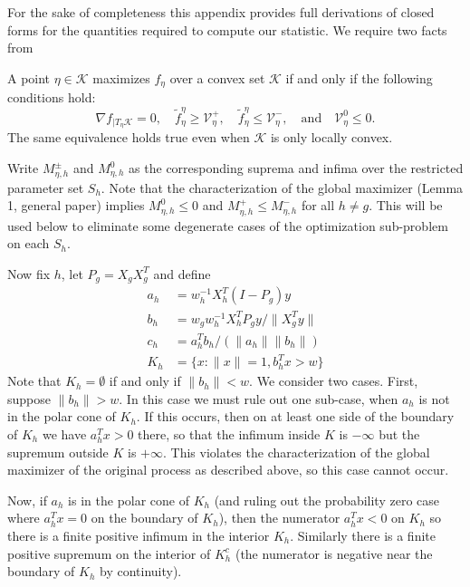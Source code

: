 \documentclass{imsart}
\newcommand{\todo}{\textcolor{red}{\textbf{To do: }}}
\newcommand{\norm}[1]{\lVert #1 \rVert}
\newcommand{\grad}{\nabla}
\newcommand{\V}{\mathcal{V}}\endlocaldefs
\newcommand{\K}{\mathcal{K}}
\newcommand\tf{\widetilde{f}}
\begin{document}

For the sake of completeness this appendix provides full derivations
of closed forms for the quantities required to compute our
statistic. We require two facts from \cite{tests:adaptive}

A point $\eta \in \K$ maximizes $f_\eta$ over a convex
set $\K$ if and only if the following conditions hold: 
\begin{equation}
\label{eq:maxcond}
\grad f_{|T_{\eta}\K} = 0, \quad
\tf^{\eta}_{\eta} \geq \V^+_{\eta}, \quad
\tf^{\eta}_{\eta} \leq \V^-_{\eta}, \quad \text{and} \quad
\V^0_{\eta} \leq 0.
\end{equation}
The same equivalence holds true even when $\K$ is only locally
convex. 

Write $M^{\pm}_{\eta, h}$ and $M^0_{\eta, h}$ as the corresponding suprema and infima over the restricted parameter set $S_h$. Note that the characterization of the global maximizer (Lemma 1, general paper) implies $M^0_{\eta, h} \leq 0$ and $M^+_{\eta, h} \leq M^-_{\eta, h}$ for all $h \neq g$. This will be used below to eliminate some degenerate cases of the optimization sub-problem on each $S_h$.

Now fix $h$, let $P_g = X_gX_g^T$ and define
\begin{align*}
a_h &= w_h^{-1} X_h^T (I-P_g) y \\
b_h &= w_g w_h^{-1} X_h^T P_g y / \norm{X_g^T y} \\
c_h &= a_h^T b_h / (\norm{a_h} \norm{b_h}) \\
K_h   &= \{ x : \norm{x} = 1, b_h^Tx > w \}
\end{align*}
Note that $K_h = \emptyset$ if and only if $\norm{b_h} < w$. We consider two cases. First, suppose $\norm{b_h} > w$. In this case we must rule out one sub-case, when $a_h$ is not in the polar cone of $K_h$. If this occurs, then on at least one side of the boundary of $K_h$ we have $a_h^Tx > 0$ there, so that the infimum inside $K$ is $-\infty$ but the supremum outside $K$ is $+\infty$. This violates the characterization of the global maximizer of the original process as described above, so this case cannot occur.

Now, if $a_h$ is in the polar cone of $K_h$ (and ruling out the probability zero case where $a_h^Tx = 0$ on the boundary of $K_h$), then the numerator $a_h^Tx < 0$ on $K_h$ so there is a finite positive infimum in the interior $K_h$. Similarly there is a finite positive supremum on the interior of $K_h^c$ (the numerator is negative near the boundary of $K_h$ by continuity).
\end{document}
